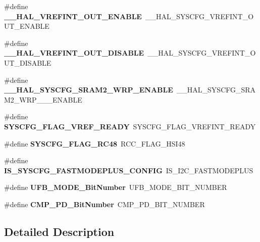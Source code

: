 \begin{DoxyCompactItemize}
\item 
\mbox{\label{group___h_a_l___aliased___macros_gac1dfd2bab2879b5106f1dc496e3c356c}} 
\#define {\bfseries \+\_\+\+\_\+\+H\+A\+L\+\_\+\+V\+R\+E\+F\+I\+N\+T\+\_\+\+O\+U\+T\+\_\+\+E\+N\+A\+B\+LE}~\+\_\+\+\_\+\+H\+A\+L\+\_\+\+S\+Y\+S\+C\+F\+G\+\_\+\+V\+R\+E\+F\+I\+N\+T\+\_\+\+O\+U\+T\+\_\+\+E\+N\+A\+B\+LE
\item 
\mbox{\label{group___h_a_l___aliased___macros_ga8ef2904e9bea234864ed664771aeed49}} 
\#define {\bfseries \+\_\+\+\_\+\+H\+A\+L\+\_\+\+V\+R\+E\+F\+I\+N\+T\+\_\+\+O\+U\+T\+\_\+\+D\+I\+S\+A\+B\+LE}~\+\_\+\+\_\+\+H\+A\+L\+\_\+\+S\+Y\+S\+C\+F\+G\+\_\+\+V\+R\+E\+F\+I\+N\+T\+\_\+\+O\+U\+T\+\_\+\+D\+I\+S\+A\+B\+LE
\item 
\mbox{\label{group___h_a_l___aliased___macros_gacc4f47478d9502c7f9326378ddf68967}} 
\#define {\bfseries \+\_\+\+\_\+\+H\+A\+L\+\_\+\+S\+Y\+S\+C\+F\+G\+\_\+\+S\+R\+A\+M2\+\_\+\+W\+R\+P\+\_\+\+E\+N\+A\+B\+LE}~\+\_\+\+\_\+\+H\+A\+L\+\_\+\+S\+Y\+S\+C\+F\+G\+\_\+\+S\+R\+A\+M2\+\_\+\+W\+R\+P\+\_\+\_\+\_\+\+E\+N\+A\+B\+LE
\item 
\mbox{\label{group___h_a_l___aliased___macros_ga2978f132138676255e533e6f18fbe5df}} 
\#define {\bfseries S\+Y\+S\+C\+F\+G\+\_\+\+F\+L\+A\+G\+\_\+\+V\+R\+E\+F\+\_\+\+R\+E\+A\+DY}~S\+Y\+S\+C\+F\+G\+\_\+\+F\+L\+A\+G\+\_\+\+V\+R\+E\+F\+I\+N\+T\+\_\+\+R\+E\+A\+DY
\item 
\mbox{\label{group___h_a_l___aliased___macros_gaaf8b670b9f5fdd39553af1637189456c}} 
\#define {\bfseries S\+Y\+S\+C\+F\+G\+\_\+\+F\+L\+A\+G\+\_\+\+R\+C48}~R\+C\+C\+\_\+\+F\+L\+A\+G\+\_\+\+H\+S\+I48
\item 
\mbox{\label{group___h_a_l___aliased___macros_ga57549e7341a90913bac75a34768b9562}} 
\#define {\bfseries I\+S\+\_\+\+S\+Y\+S\+C\+F\+G\+\_\+\+F\+A\+S\+T\+M\+O\+D\+E\+P\+L\+U\+S\+\_\+\+C\+O\+N\+F\+IG}~I\+S\+\_\+\+I2\+C\+\_\+\+F\+A\+S\+T\+M\+O\+D\+E\+P\+L\+US
\item 
\mbox{\label{group___h_a_l___aliased___macros_gaa531b9c8535235ee73455c2b88663c03}} 
\#define {\bfseries U\+F\+B\+\_\+\+M\+O\+D\+E\+\_\+\+Bit\+Number}~U\+F\+B\+\_\+\+M\+O\+D\+E\+\_\+\+B\+I\+T\+\_\+\+N\+U\+M\+B\+ER
\item 
\mbox{\label{group___h_a_l___aliased___macros_ga0ca336e48ea4840c7d1cde05a0e07e82}} 
\#define {\bfseries C\+M\+P\+\_\+\+P\+D\+\_\+\+Bit\+Number}~C\+M\+P\+\_\+\+P\+D\+\_\+\+B\+I\+T\+\_\+\+N\+U\+M\+B\+ER
\end{DoxyCompactItemize}


\subsection{Detailed Description}
